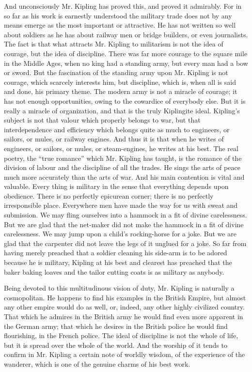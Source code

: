 And unconsciously Mr. Kipling has proved this, and proved it admirably. For in so far as his work is earnestly understood the military trade does not by any means emerge as the most important or attractive. He has not written so well about soldiers as he has about railway men or bridge builders, or even journalists. The fact is that what attracts Mr. Kipling to militarism is not the idea of courage, but the idea of discipline. There was far more courage to the square mile in the Middle Ages, when no king had a standing army, but every man had a bow or sword. But the fascination of the standing army upon Mr. Kipling is not courage, which scarcely interests him, but discipline, which is, when all is said and done, his primary theme. The modern army is not a miracle of courage; it has not enough opportunities, owing to the cowardice of everybody else. But it is really a miracle of organization, and that is the truly Kiplingite ideal. Kipling’s subject is not that valour which properly belongs to war, but that interdependence and efficiency which belongs quite as much to engineers, or sailors, or mules, or railway engines. And thus it is that when he writes of engineers, or sailors, or mules, or steam-engines, he writes at his best. The real poetry, the “true romance” which Mr. Kipling has taught, is the romance of the division of labour and the discipline of all the trades. He sings the arts of peace much more accurately than the arts of war. And his main contention is vital and valuable. Every thing is military in the sense that everything depends upon obedience. There is no perfectly epicurean corner; there is no perfectly irresponsible place. Everywhere men have made the way for us with sweat and submission. We may fling ourselves into a hammock in a fit of divine carelessness. But we are glad that the net-maker did not make the hammock in a fit of divine carelessness. We may jump upon a child’s rocking-horse for a joke. But we are glad that the carpenter did not leave the legs of it unglued for a joke. So far from having merely preached that a soldier cleaning his side-arm is to be adored because he is military, Kipling at his best and clearest has preached that the baker baking loaves and the tailor cutting coats is as military as anybody.

Being devoted to this multitudinous vision of duty, Mr. Kipling is naturally a cosmopolitan. He happens to find his examples in the British Empire, but almost any other empire would do as well, or, indeed, any other highly civilized country. That which he admires in the British army he would find even more apparent in the German army; that which he desires in the British police he would find flourishing, in the French police. The ideal of discipline is not the whole of life, but it is spread over the whole of the world. And the worship of it tends to confirm in Mr. Kipling a certain note of worldly wisdom, of the experience of the wanderer, which is one of the genuine charms of his best work.

